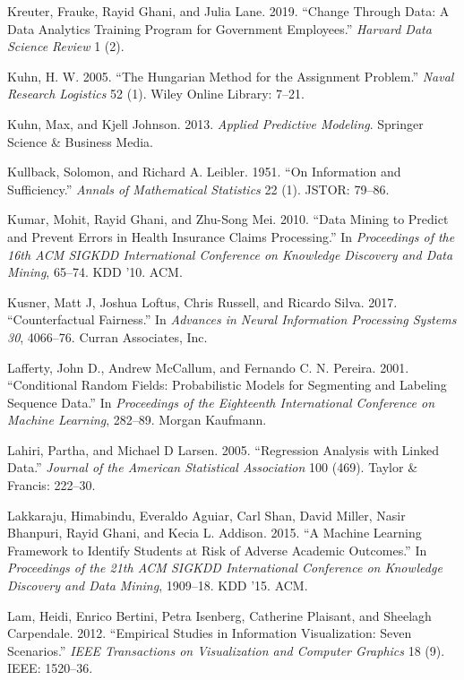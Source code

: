 \documentclass[]{krantz}
\begin{document}
\hypertarget{ref-Kreuter2019Change}{}
Kreuter, Frauke, Rayid Ghani, and Julia Lane. 2019. ``Change Through
Data: A Data Analytics Training Program for Government Employees.''
\emph{Harvard Data Science Review} 1 (2).

\hypertarget{ref-kuhn2005hungarian}{}
Kuhn, H. W. 2005. ``The Hungarian Method for the Assignment Problem.''
\emph{Naval Research Logistics} 52 (1). Wiley Online Library: 7--21.

\hypertarget{ref-KuhnJohnson2013}{}
Kuhn, Max, and Kjell Johnson. 2013. \emph{Applied Predictive Modeling}.
Springer Science \& Business Media.

\hypertarget{ref-kullback1951information}{}
Kullback, Solomon, and Richard A. Leibler. 1951. ``On Information and
Sufficiency.'' \emph{Annals of Mathematical Statistics} 22 (1). JSTOR:
79--86.

\hypertarget{ref-Kumar2010}{}
Kumar, Mohit, Rayid Ghani, and Zhu-Song Mei. 2010. ``Data Mining to
Predict and Prevent Errors in Health Insurance Claims Processing.'' In
\emph{Proceedings of the 16th ACM SIGKDD International Conference on
Knowledge Discovery and Data Mining}, 65--74. KDD '10. ACM.

\hypertarget{ref-kusner2017}{}
Kusner, Matt J, Joshua Loftus, Chris Russell, and Ricardo Silva. 2017.
``Counterfactual Fairness.'' In \emph{Advances in Neural Information
Processing Systems 30}, 4066--76. Curran Associates, Inc.

\hypertarget{ref-lafferty-01}{}
Lafferty, John D., Andrew McCallum, and Fernando C. N. Pereira. 2001.
``Conditional Random Fields: Probabilistic Models for Segmenting and
Labeling Sequence Data.'' In \emph{Proceedings of the Eighteenth
International Conference on Machine Learning}, 282--89. Morgan Kaufmann.

\hypertarget{ref-lahiri2005regression}{}
Lahiri, Partha, and Michael D Larsen. 2005. ``Regression Analysis with
Linked Data.'' \emph{Journal of the American Statistical Association}
100 (469). Taylor \& Francis: 222--30.

\hypertarget{ref-Lakkaraju2015}{}
Lakkaraju, Himabindu, Everaldo Aguiar, Carl Shan, David Miller, Nasir
Bhanpuri, Rayid Ghani, and Kecia L. Addison. 2015. ``A Machine Learning
Framework to Identify Students at Risk of Adverse Academic Outcomes.''
In \emph{Proceedings of the 21th ACM SIGKDD International Conference on
Knowledge Discovery and Data Mining}, 1909--18. KDD '15. ACM.

\hypertarget{ref-lam2012empirical}{}
Lam, Heidi, Enrico Bertini, Petra Isenberg, Catherine Plaisant, and
Sheelagh Carpendale. 2012. ``Empirical Studies in Information
Visualization: Seven Scenarios.'' \emph{IEEE Transactions on
Visualization and Computer Graphics} 18 (9). IEEE: 1520--36.
\end{document}
